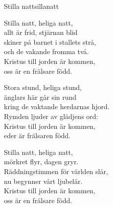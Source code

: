 \begin{song}{Stilla natt}{sillanatt}
\begin{vers}
Stilla natt, heliga natt,\\
allt är frid, stjärnan blid\\
skiner på barnet i stallets strå,\\
och de vakande fromma två.\\
Kristus till jorden är kommen,\\
oss är en frälsare född.\\
\end{vers}
\begin{vers}
Stora stund, heliga stund,\\
änglars här går sin rund\\
kring de vaktande herdarnas hjord.\\
Rymden ljuder av glädjens ord:\\
Kristus till jorden är kommen,\\
eder är frälsaren född.\\
\end{vers}
\begin{vers}
Stilla natt, heliga natt,\\
mörkret flyr, dagen gryr.\\
Räddningstimmen för världen slår,\\
nu begynner vårt ljubelår.\\
Kristus till jorden är kommen,\\
oss är en frälsare född.\\
\end{vers}
\end{song}
